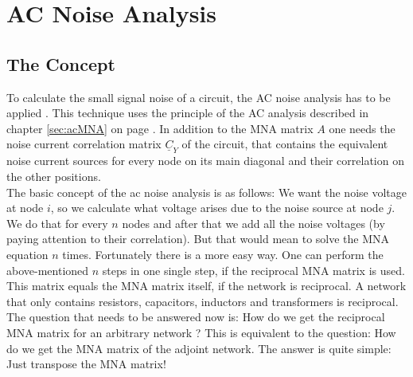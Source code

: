 %
%
%
%

\chapter{AC Noise Analysis}

\section{The Concept}

To calculate the small signal noise of a circuit, the AC noise analysis
has to be applied \cite{Blum}. This technique uses the principle of
the AC analysis
described in chapter \ref{sec:acMNA} on page \pageref{sec:acMNA}. In
addition to the MNA matrix $A$ one needs the noise current correlation
matrix $\underline{C}_Y$ of the circuit, that contains the equivalent
noise current sources for every node on its main diagonal and their
correlation on the other positions.\\
The basic concept of the ac noise analysis is as follows: We want the
noise voltage at node $i$, so we calculate what voltage arises due to
the noise source at node $j$. We do that for every $n$ nodes and after
that we add all the noise voltages (by paying attention to their
correlation). But that would mean to solve the MNA equation $n$ times.
Fortunately there is a more easy way. One can perform the
above-mentioned $n$ steps in one single step, if the reciprocal MNA
matrix is used. This matrix equals the MNA matrix itself, if the
network is reciprocal. A network that only contains resistors,
capacitors, inductors and transformers is reciprocal.\\
The question that needs to be answered now is: How do we get the
reciprocal MNA matrix for an arbitrary network ? This is
equivalent to the question: How do we get the MNA matrix of the
adjoint network. The answer is quite simple: Just transpose the MNA
matrix!\\

